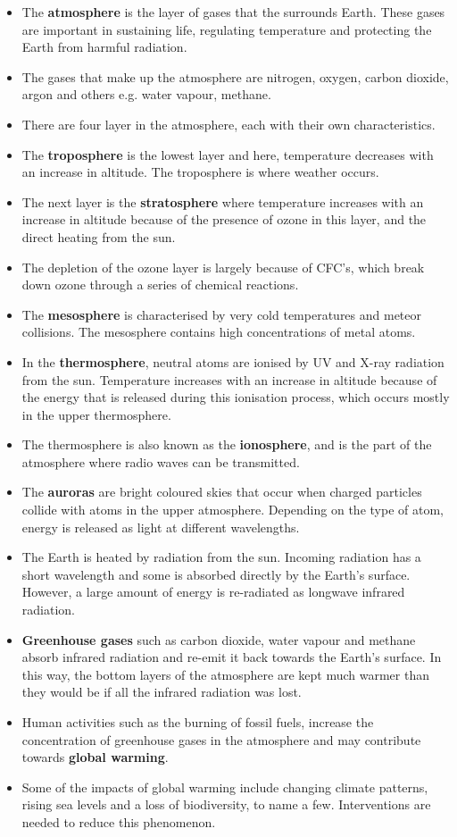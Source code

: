 \begin{itemize}
\item{The \textbf{atmosphere} is the layer of gases that the surrounds Earth. These gases are important in sustaining life, regulating temperature and protecting the Earth from harmful radiation.}
\item{The gases that make up the atmosphere are nitrogen, oxygen, carbon dioxide, argon and others e.g. water vapour, methane.}
\item{There are four layer in the atmosphere, each with their own characteristics.}
\item{The \textbf{troposphere} is the lowest layer and here, temperature decreases with an increase in altitude. The troposphere is where weather occurs.}
\item{The next layer is the \textbf{stratosphere} where temperature increases with an increase in altitude because of the presence of ozone in this layer, and the direct heating from the sun.}
\item{The depletion of the ozone layer is largely because of CFC's, which break down ozone through a series of chemical reactions.}
\item{The \textbf{mesosphere} is characterised by very cold temperatures and meteor collisions. The mesosphere contains high concentrations of metal atoms.}
\item{In the \textbf{thermosphere}, neutral atoms are ionised by UV and X-ray radiation from the sun. Temperature increases with an increase in altitude because of the energy that is released during this ionisation process, which occurs mostly in the upper thermosphere. }
\item{The thermosphere is also known as the \textbf{ionosphere}, and is the part of the atmosphere where radio waves can be transmitted.}
\item{The \textbf{auroras} are bright coloured skies that occur when charged particles collide with atoms in the upper atmosphere. Depending on the type of atom, energy is released as light at different wavelengths.}
\item{The Earth is heated by radiation from the sun. Incoming radiation has a short wavelength and some is absorbed directly by the Earth's surface. However, a large amount of energy is re-radiated as longwave infrared radiation.}
\item{\textbf{Greenhouse gases} such as carbon dioxide, water vapour and methane absorb infrared radiation and re-emit it back towards the Earth's surface. In this way, the bottom layers of the atmosphere are kept much warmer than they would be if all the infrared radiation was lost.}
\item{Human activities such as the burning of fossil fuels, increase the concentration of greenhouse gases in the atmosphere and may contribute towards \textbf{global warming}.}
\item{Some of the impacts of global warming include changing climate patterns, rising sea levels and a loss of biodiversity, to name a few. Interventions are needed to reduce this phenomenon.}
\end{itemize}

